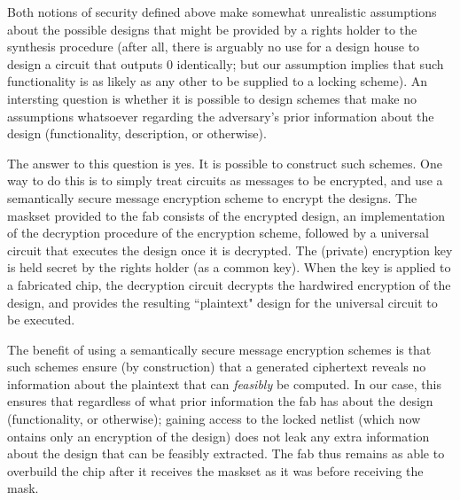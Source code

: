  
\begin{definition}
Both notions of security defined above make somewhat unrealistic assumptions about the possible designs that might be provided by a rights holder to the synthesis procedure (after all, there is arguably no use for a design house to design a circuit that outputs $0$ identically; but our assumption implies that such functionality is as likely as any other to be supplied to a locking scheme). An intersting question is whether it is possible to design schemes that make no assumptions whatsoever regarding the adversary's prior information about the design (functionality, description, or otherwise).

The answer to this question is yes. It is possible to construct such schemes. One way to do this is to simply treat circuits as messages to be encrypted, and use a semantically secure message encryption scheme to encrypt the designs. The maskset provided to the fab consists of the encrypted design, an implementation of the decryption procedure of the encryption scheme, followed by a universal circuit that executes the design once it is decrypted. The (private) encryption key is held secret by the rights holder (as a common key). When the key is applied to a fabricated chip, the decryption circuit decrypts the hardwired encryption of the design, and provides the resulting ``plaintext" design for the universal circuit to be executed. 

The benefit of using a semantically secure message encryption schemes is that such schemes ensure (by construction) that a generated ciphertext reveals no information about the plaintext that can \emph{feasibly} be computed. In our case, this ensures that regardless of what prior information the fab has about the design (functionality, or otherwise); gaining access to the locked netlist (which now ontains only an encryption of the design) does not leak any extra information about the design that can be feasibly extracted. The fab thus remains as able to overbuild the chip after it receives the maskset as it was before receiving the mask.


\end{definition}
